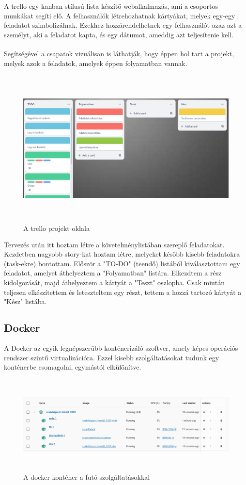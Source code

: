 \documentclass[
]{thesis-ekf}
\theoremstyle{definition}
\theoremstyle{remark}
\begin{document}
A trello egy kanban stílusú lista készítő webalkalmazás, ami a csoportos munkákat segíti elő. A felhasználók létrehozhatnak kártyákat, melyek egy-egy feladatot szimbolizálnak. Ezekhez hozzárendelhetnek egy felhasználót azaz azt a személyt, aki a feladatot kapta, és egy dátumot, ameddig azt teljesítenie kell.
\\\\
Segítségével a csapatok vizuálisan is láthatják, hogy éppen hol tart a projekt, melyek azok a feladatok, amelyek éppen folyamatban vannak.

\begin{figure}[H]
	\centering
	\includegraphics[width=15cm, height=8cm]{trello}
	\caption{A trello projekt oldala}
	\label{fig:picture}
\end{figure}

Tervezés után itt hoztam létre a követelménylistában szereplő feladatokat. Kezdetben nagyobb story-kat hoztam létre, melyeket később kisebb feladatokra (task-ekre) bontottam. Először a "TO-DO" (teendő) listából kiválasztottam egy feladatot, amelyet áthelyeztem a "Folyamatban" listára. Elkezdtem a rész kidolgozását, majd áthelyeztem a kártyát a "Teszt" oszlopba. Csak miután teljesen elkészítettem és leteszteltem egy részt, tettem a hozzá tartozó kártyát a "Kész" listába.

\subsection{Docker}

A Docker az egyik legnépszerűbb konténerizáló szoftver, amely képes operációs rendszer szintű virtualizációra. Ezzel kisebb szolgáltatásokat tudunk egy konténerbe csomagolni, egymástól elkülönítve.

\begin{figure}[H]
	\centering
	\includegraphics[width=15cm, height=5cm]{docker}
	\caption{A docker konténer a futó szolgáltatásokkal}
	\label{fig:picture}
\end{figure}
\end{document}
